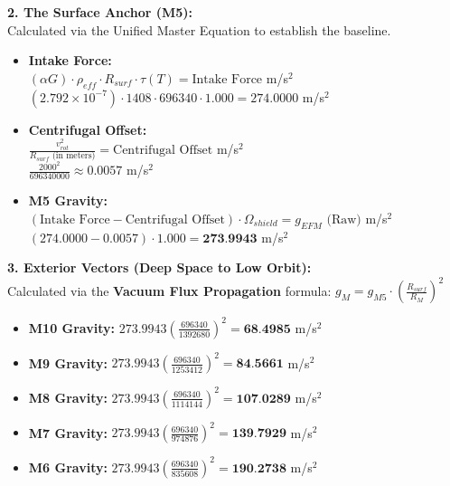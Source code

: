\documentclass[11pt, a4paper]{article}
\begin{document}
  \vspace{1.0em}
  \noindent \textbf{2. The Surface Anchor (M5):} \\
  \hspace*{1em} Calculated via the Unified Master Equation to establish the baseline.
  \begin{itemize}
    \item \textbf{Intake Force:} \\[0.5em]
    \hspace*{2em} $(\alpha G) \cdot \rho_{eff} \cdot R_{surf} \cdot \tau(T) = \text{Intake Force}$ m/s$^2$ \\[1em]
    \hspace*{2em} $(2.792 \times 10^{-7}) \cdot 1408 \cdot 696340 \cdot 1.000 = 274.0000$ m/s$^2$
    
    \item \textbf{Centrifugal Offset:} \\[0.5em]
    \hspace*{2em} $\frac{v_{rot}^2}{R_{surf} \text{ (in meters)}} = \text{Centrifugal Offset}$ m/s$^2$ \\[1em]
    \hspace*{2em} $\frac{2000^2}{696340000} \approx 0.0057$ m/s$^2$
    
    \item \textbf{M5 Gravity:} \\[0.5em]
    \hspace*{2em} $(\text{Intake Force} - \text{Centrifugal Offset}) \cdot \Omega_{shield} = g_{EFM} \text{ (Raw)}$ m/s$^2$ \\[1em]
    \hspace*{2em} $(274.0000 - 0.0057) \cdot 1.000 = \textbf{273.9943}$ m/s$^2$
  \end{itemize}

  \clearpage
  \noindent \textbf{3. Exterior Vectors (Deep Space to Low Orbit):} \\
  \hspace*{1em} Calculated via the \textbf{Vacuum Flux Propagation} formula: $g_M = g_{M5} \cdot \left( \frac{R_{surf}}{R_M} \right)^2$
  \begin{itemize}
    \item \textbf{M10 Gravity:} $273.9943 \left( \frac{696340}{1392680} \right)^2 = \textbf{68.4985}$ m/s$^2$
    \item \textbf{M9 Gravity:} $273.9943 \left( \frac{696340}{1253412} \right)^2 = \textbf{84.5661}$ m/s$^2$
    \item \textbf{M8 Gravity:} $273.9943 \left( \frac{696340}{1114144} \right)^2 = \textbf{107.0289}$ m/s$^2$
    \item \textbf{M7 Gravity:} $273.9943 \left( \frac{696340}{974876} \right)^2 = \textbf{139.7929}$ m/s$^2$
    \item \textbf{M6 Gravity:} $273.9943 \left( \frac{696340}{835608} \right)^2 = \textbf{190.2738}$ m/s$^2$
  \end{itemize}
\end{document}

